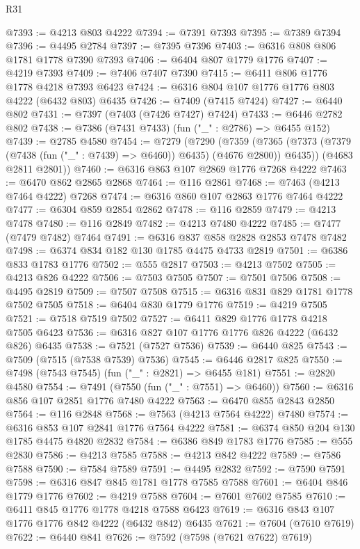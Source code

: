 \begin{lexlean}{R31}
\begin{coremodule}
@7393 := @4213 @803 @4222
@7394 := @7391 @7393
@7395 := @7389 @7394
@7396 := @4495 @2784
@7397 := @7395 @7396
@7403 := @6316 @808 @806 @1781 @1778 @7390 @7393
@7406 := @6404 @807 @1779 @1776
@7407 := @4219 @7393
@7409 := @7406 @7407 @7390
@7415 := @6411 @806 @1776 @1778 @4218 @7393 @6423
@7424 := @6316 @804 @107 @1776 @1776 @803 @4222 (@6432 @803) @6435
@7426 := @7409 (@7415 @7424)
@7427 := @6440 @802
@7431 := @7397 (@7403 (@7426 @7427) @7424)
@7433 := @6446 @2782 @802
@7438 := @7386 (@7431 @7433) (fun ("_" : @2786) => @6455 @152)
@7439 := @2785 @4580
@7454 := @7279
    (@7290
      (@7359 (@7365 (@7373 (@7379 (@7438 (fun ("_" : @7439) => @6460)) @6435) (@4676 @2800)) @6435))
      (@4683 @2811 @2801))
@7460 := @6316 @863 @107 @2869 @1776 @7268 @4222
@7463 := @6470 @862 @2865 @2868
@7464 := @116 @2861
@7468 := @7463 (@4213 @7464 @4222) @7268
@7474 := @6316 @860 @107 @2863 @1776 @7464 @4222
@7477 := @6304 @859 @2854 @2862
@7478 := @116 @2859
@7479 := @4213 @7478
@7480 := @116 @2849
@7482 := @4213 @7480 @4222
@7485 := @7477 (@7479 @7482) @7464
@7491 := @6316 @837 @858 @2828 @2853 @7478 @7482
@7498 := @6374 @834 @182 @130 @1785 @4475 @4733 @2819
@7501 := @6386 @833 @1783 @1776
@7502 := @555 @2817
@7503 := @4213 @7502
@7505 := @4213 @826 @4222
@7506 := @7503 @7505
@7507 := @7501 @7506
@7508 := @4495 @2819
@7509 := @7507 @7508
@7515 := @6316 @831 @829 @1781 @1778 @7502 @7505
@7518 := @6404 @830 @1779 @1776
@7519 := @4219 @7505
@7521 := @7518 @7519 @7502
@7527 := @6411 @829 @1776 @1778 @4218 @7505 @6423
@7536 := @6316 @827 @107 @1776 @1776 @826 @4222 (@6432 @826) @6435
@7538 := @7521 (@7527 @7536)
@7539 := @6440 @825
@7543 := @7509 (@7515 (@7538 @7539) @7536)
@7545 := @6446 @2817 @825
@7550 := @7498 (@7543 @7545) (fun ("_" : @2821) => @6455 @181)
@7551 := @2820 @4580
@7554 := @7491 (@7550 (fun ("_" : @7551) => @6460))
@7560 := @6316 @856 @107 @2851 @1776 @7480 @4222
@7563 := @6470 @855 @2843 @2850
@7564 := @116 @2848
@7568 := @7563 (@4213 @7564 @4222) @7480
@7574 := @6316 @853 @107 @2841 @1776 @7564 @4222
@7581 := @6374 @850 @204 @130 @1785 @4475 @4820 @2832
@7584 := @6386 @849 @1783 @1776
@7585 := @555 @2830
@7586 := @4213 @7585
@7588 := @4213 @842 @4222
@7589 := @7586 @7588
@7590 := @7584 @7589
@7591 := @4495 @2832
@7592 := @7590 @7591
@7598 := @6316 @847 @845 @1781 @1778 @7585 @7588
@7601 := @6404 @846 @1779 @1776
@7602 := @4219 @7588
@7604 := @7601 @7602 @7585
@7610 := @6411 @845 @1776 @1778 @4218 @7588 @6423
@7619 := @6316 @843 @107 @1776 @1776 @842 @4222 (@6432 @842) @6435
@7621 := @7604 (@7610 @7619)
@7622 := @6440 @841
@7626 := @7592 (@7598 (@7621 @7622) @7619)

\end{coremodule}
\end{lexlean}
